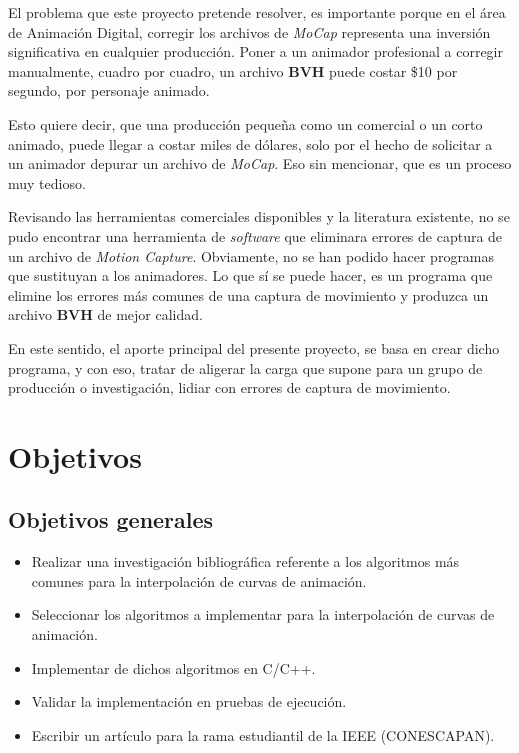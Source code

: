 El problema que este proyecto pretende resolver, es importante porque en el área de Animación Digital, corregir los archivos de \textit{MoCap} representa una inversión significativa en cualquier producción.  Poner a un animador profesional a corregir manualmente, cuadro por cuadro, un archivo \textbf{BVH} puede costar \$10 por segundo, por personaje animado.  

Esto quiere decir, que una producción pequeña como un comercial o un corto animado, puede llegar a costar miles de dólares, solo por el hecho de solicitar a un animador depurar un archivo de \textit{MoCap}. Eso sin mencionar, que es un proceso muy tedioso.

Revisando las herramientas comerciales disponibles y la literatura existente, no se pudo encontrar una herramienta de \textit{software} que eliminara errores de captura de un archivo de \textit{Motion Capture}.  Obviamente, no se han podido hacer programas que sustituyan a los animadores.  Lo que sí se puede hacer, es un programa que elimine los errores más comunes de una captura de movimiento y produzca un archivo \textbf{BVH} de mejor calidad.

En este sentido, el aporte principal del presente proyecto, se basa en crear dicho programa, y con eso, tratar de aligerar la carga que supone para un grupo de producción o investigación, lidiar con errores de captura de movimiento.



\section{Objetivos}

\subsection{Objetivos generales}

\begin{itemize}
\item Realizar una investigación bibliográfica referente a los algoritmos más comunes para la interpolación de curvas de animación.
\item Seleccionar los algoritmos a implementar para la interpolación de curvas de animación.
\item Implementar de dichos algoritmos en C/C++.
\item Validar la implementación en pruebas de ejecución.
\item Escribir un artículo para la rama estudiantil de la IEEE  (CONESCAPAN).
\end{itemize}

